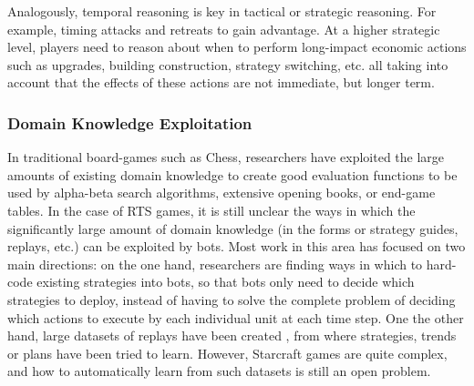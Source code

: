 \documentclass[journal]{IEEEtran}
\begin{document}

Analogously, temporal reasoning is key in tactical or strategic reasoning. For example, timing attacks and retreats to gain advantage. At a higher strategic level, players need to reason about when to perform long-impact economic actions such as upgrades, building construction, strategy switching, etc. all taking into account that the effects of these actions are not immediate, but longer term.


\subsubsection{Domain Knowledge Exploitation}
In traditional board-games such as Chess, researchers have exploited the large amounts of existing domain knowledge to create good evaluation functions to be used by alpha-beta search algorithms, extensive opening books, or end-game tables. In the case of RTS games, it is still unclear the ways in which the significantly large amount of domain knowledge (in the forms or strategy guides, replays, etc.) can be exploited by bots. Most work in this area has focused on two main directions: on the one hand, researchers are finding ways in which to hard-code existing strategies into bots, so that bots only need to decide which strategies to deploy, instead of having to solve the complete problem of deciding which actions to execute by each individual unit at each time step. One the other hand, large datasets of replays have been created \cite{synnaeve2012dataset}, from where strategies, trends or plans have been tried to learn. However, Starcraft games are quite complex, and how to automatically learn from such datasets is still an open problem.
\end{document}
